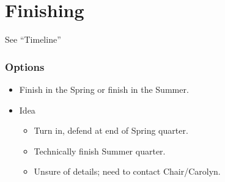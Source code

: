 \documentclass{beamer}
\begin{document}
\section{Finishing}

\begin{frame}
  \begin{huge}
    See ``Timeline''
  \end{huge}
\end{frame}

\begin{frame}
  \frametitle{Options}
  \begin{itemize}
    \item Finish in the Spring or finish in the Summer.
    \item Idea
      \begin{itemize}
        \item Turn in, defend at end of Spring quarter.
        \item Technically finish Summer quarter.
        \item Unsure of details; need to contact Chair/Carolyn.
      \end{itemize}
  \end{itemize}
\end{frame}
\end{document}
